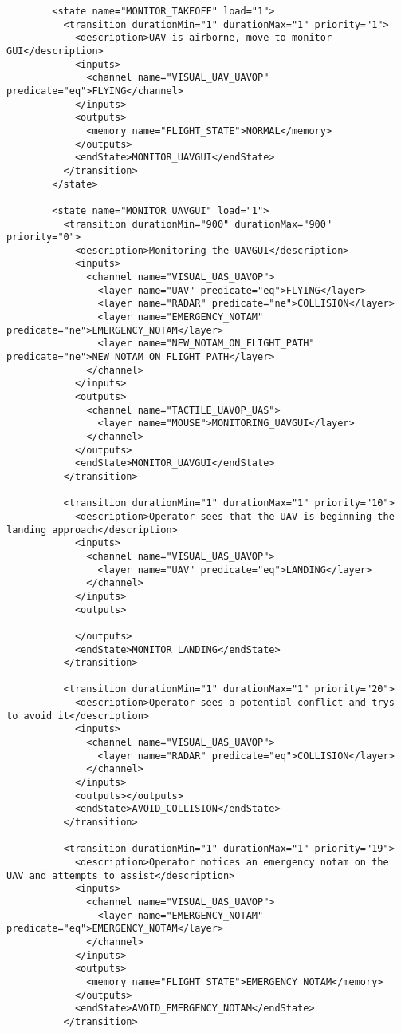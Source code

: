 \begin{verbatim}
        <state name="MONITOR_TAKEOFF" load="1">
          <transition durationMin="1" durationMax="1" priority="1">
            <description>UAV is airborne, move to monitor GUI</description>
            <inputs>
              <channel name="VISUAL_UAV_UAVOP" predicate="eq">FLYING</channel>
            </inputs>
            <outputs>
              <memory name="FLIGHT_STATE">NORMAL</memory>
            </outputs>
            <endState>MONITOR_UAVGUI</endState>
          </transition>
        </state>
        
        <state name="MONITOR_UAVGUI" load="1">
          <transition durationMin="900" durationMax="900" priority="0">
            <description>Monitoring the UAVGUI</description>
            <inputs>
              <channel name="VISUAL_UAS_UAVOP">
                <layer name="UAV" predicate="eq">FLYING</layer>
                <layer name="RADAR" predicate="ne">COLLISION</layer>
                <layer name="EMERGENCY_NOTAM" predicate="ne">EMERGENCY_NOTAM</layer>
                <layer name="NEW_NOTAM_ON_FLIGHT_PATH" predicate="ne">NEW_NOTAM_ON_FLIGHT_PATH</layer>
              </channel>
            </inputs>
            <outputs>
              <channel name="TACTILE_UAVOP_UAS">
                <layer name="MOUSE">MONITORING_UAVGUI</layer>
              </channel>
            </outputs>
            <endState>MONITOR_UAVGUI</endState>
          </transition>
          
          <transition durationMin="1" durationMax="1" priority="10">
            <description>Operator sees that the UAV is beginning the landing approach</description>
            <inputs>
              <channel name="VISUAL_UAS_UAVOP">
                <layer name="UAV" predicate="eq">LANDING</layer>
              </channel>
            </inputs>
            <outputs>
              
            </outputs>
            <endState>MONITOR_LANDING</endState>
          </transition>
          
          <transition durationMin="1" durationMax="1" priority="20">
            <description>Operator sees a potential conflict and trys to avoid it</description>
            <inputs>
              <channel name="VISUAL_UAS_UAVOP">
                <layer name="RADAR" predicate="eq">COLLISION</layer>
              </channel>
            </inputs>
            <outputs></outputs>
            <endState>AVOID_COLLISION</endState>
          </transition>
          
          <transition durationMin="1" durationMax="1" priority="19">
            <description>Operator notices an emergency notam on the UAV and attempts to assist</description>
            <inputs>
              <channel name="VISUAL_UAS_UAVOP">
                <layer name="EMERGENCY_NOTAM" predicate="eq">EMERGENCY_NOTAM</layer>
              </channel>
            </inputs>
            <outputs>
              <memory name="FLIGHT_STATE">EMERGENCY_NOTAM</memory>
            </outputs>
            <endState>AVOID_EMERGENCY_NOTAM</endState>
          </transition>
          

\end{verbatim}
